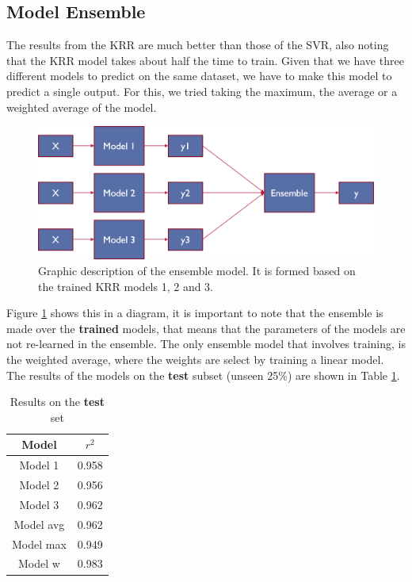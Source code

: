 \subsection{Model Ensemble}

The results from the KRR are much better than those of the SVR, also noting that the KRR model takes about half the time to train. Given that we have three different models to predict on the same dataset, we have to make this model to predict a single output. For this, we tried taking the maximum, the average or a weighted average of the model. 
\begin{figure}[h!]
	\centering
	\includegraphics[width=1\linewidth]{TeX_files/Imagenes/ensemble_model}
	\caption{Graphic description of the ensemble model. It is formed based on the trained KRR models 1, 2 and 3.}
	\label{fig:ensemblemodel}
\end{figure}

Figure \ref{fig:ensemblemodel} shows this in a diagram, it is important to note that the ensemble is made over the \textbf{trained} models, that means that the parameters of the models are not re-learned in the ensemble. The only ensemble model that involves training, is the weighted average, where the weights are select by training a linear model. The results of the models on the \textbf{test} subset (unseen 25\%) are shown in Table \ref{table:test-result}. 

\begin{table}[h!]
	\centering
	\begin{tabular}{|c|c|}
		\hline 
		Model & $r^2$ \\ 
		\hline 
		Model 1 & 0.958 \\ 
		\hline 
		Model 2 & 0.956 \\ 
		\hline 
		Model 3 & 0.962 \\ 
		\hline 
		Model avg & 0.962 \\ 
		\hline 
		Model max & 0.949 \\ 
		\hline 
		Model w & 0.983 \\ 
		\hline 
	\end{tabular} 
	\caption{Results on the \textbf{test} set}
	\label{table:test-result}
\end{table}

